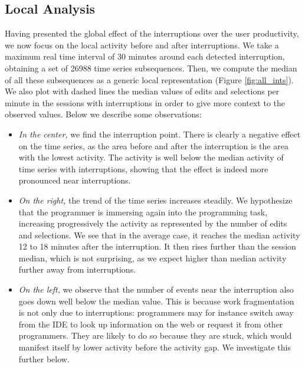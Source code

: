 \documentclass[times]{smrauth}
\begin{document}
\subsection{Local Analysis}

Having presented the global effect of the interruptions over the user productivity, we now focus on the local activity before and after interruptions. We take a maximum real time interval of 30 minutes around each detected interruption, obtaining a set of 26988 time series subsequences. Then, we compute the median of all these subsequences as a generic local representation (Figure \ref{fig:all_ints}). We also plot with dashed lines the median values of edits and selections per minute in the sessions with interruptions in order to give more context to the observed values.
Below we describe some observations:
\begin{itemize}
\item \textit{In the center,} we find the interruption point. There is clearly a negative effect on the time series, as the area before and after the interruption is the area with the lowest activity. The activity is well below the median activity of time series with interruptions, showing that the effect is indeed more pronounced near interruptions.

\item \textit{On the right,} the trend of the time series increases steadily. We hypothesize that the programmer is immersing again into the programming task, increasing progressively the activity as represented by the number of edits and selections. We see that in the average case, it reaches the median activity 12 to 18 minutes after the interruption. It then rises further than the session median, which is not surprising, as we expect higher than median activity further away from interruptions.


\item \textit{On the left,} we observe that the number of events near the interruption also goes down well below the median value. This is because work fragmentation is not only due to interruptions: programmers may for instance switch away from the IDE to look up information on the web or request it from other programmers. They are likely to do so because they are stuck, which would manifest itself by lower activity before the activity gap. We investigate this further below.

\end{itemize}
\end{document}

